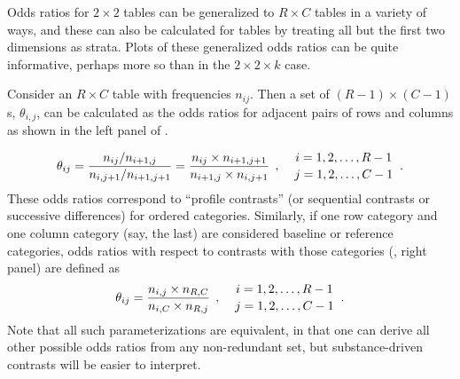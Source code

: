 \documentclass[10pt,krantz2]{krantz}\usepackage[]{graphicx}\usepackage[]{color}
\begin{document}
Odds ratios for $2 \times 2$ tables can be generalized to $R \times C$ tables in a variety of
ways, and these can also be calculated for \nway tables by treating all but the first two dimensions as strata.
Plots of these generalized odds ratios can be quite informative, perhaps more so than in the $2 \times 2 \times k$ case.

Consider an $R \times C$ table with frequencies $n_{ij}$.  Then a set of $(R-1)\times(C-1)$
s, $\theta_{i,j}$, can be calculated as the odds ratios for adjacent pairs of rows and columns
as shown in the left panel of .

\begin{equation*}
    \theta_{ij} = \frac{n_{ij} / n_{i+1, j}} { n_{i,j+1} / n_{i+1, j+1}}
  	            = \frac{n_{ij} \times n_{i+1, j+1}} { n_{i+1, j} \times n_{i,j+1} } 
\:\: , \quad 
{{i=1, 2, \dots, R-1} \atop {j=1, 2, \dots, C-1}}
\:\: .
\end{equation*}
These odds ratios correspond to ``profile contrasts''  (or sequential contrasts or successive differences) for ordered categories.  Similarly, if one row category and one column category (say, the last)
are considered baseline or reference categories,
odds ratios with respect to contrasts with those categories (, right panel) are defined as
\begin{equation*}
\theta_{ij} = \frac{n_{i,j} \times n_{R,C}}{n_{i,C} \times n_{R,j}}
\:\: , \quad 
{{i=1, 2, \dots, R-1} \atop {j=1, 2, \dots, C-1}}
\:\: .
\end{equation*}
Note that all such parameterizations are equivalent, in that one can derive all
other possible odds ratios from any non-redundant set, but substance-driven contrasts will be easier to interpret.
\end{document}

